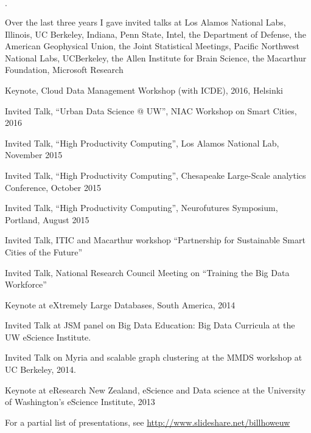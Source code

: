 \documentclass[10pt]{article}
\newenvironment{bulletlist}
   {
      \begin{list}
         {$\cdot$}
         {
            \setlength{\itemsep}{.5ex}
            \setlength{\parsep}{0ex}
            \setlength{\leftmargin}{0.7em}
            \setlength{\parskip}{0ex}
            \setlength{\topsep}{0ex}
         }
   }
   {
      \end{list}
   }
\newcommand{\marginlabel}[1]{
\begin{minipage}[b]{0.8\labelwidth}{\large \textsf{\textbf{#1}}}\end{minipage}}
\newcommand{\entrylabel}[1]{\mbox{\marginlabel{#1}}\hfill}
\newcommand{\MainListlabel}[1]
   {
      \parbox[t]{\labelwidth}{\hspace{.8em}\marginlabel{#1}}
   }
\newenvironment{MainList}[1]
   {
      \renewcommand{\entrylabel}{\MainListlabel}
      \begin{list}{}
      {
         \renewcommand{\makelabel}{\entrylabel}
         \setlength   {\itemindent}{-.65em}
         \setlength   {\labelwidth}{#1}
         \setlength   {\leftmargin}{\labelwidth}
         \setlength   {\itemsep}{3ex}
      }
   }
   {
      \end{list}
   }
\begin{document}
\begin{MainList}{88pt}
\begin{bulletlist}
  \item Over the last three years I gave invited
  talks at Los Alamos National Labs, Illinois, UC Berkeley, Indiana, Penn State, Intel, the Department of Defense, 
  the American Geophysical Union, the Joint Statistical Meetings, Pacific Northwest National Labs, UCBerkeley,
  the Allen Institute for Brain Science, the Macarthur Foundation, Microsoft Research
  \item Keynote, Cloud Data Management Workshop (with ICDE), 2016, Helsinki
  \item Invited Talk, “Urban Data Science @ UW”, NIAC Workshop on Smart Cities, 2016
  \item Invited Talk, “High Productivity Computing”, Los Alamos National Lab, November 2015
  \item Invited Talk, “High Productivity Computing”, Chesapeake Large-Scale analytics Conference, October 2015
  \item Invited Talk, “High Productivity Computing”, Neurofutures Symposium, Portland, August 2015
  \item Invited Talk, ITIC and Macarthur workshop ``Partnership for Sustainable Smart Cities of the Future''
  \item Invited Talk, National Research Council Meeting on ``Training the Big Data Workforce''
  \item Keynote at eXtremely Large Databases, South America, 2014
  \item Invited Talk at JSM panel on Big Data Education: Big Data Curricula at the UW eScience Institute.
  \item Invited Talk on Myria and scalable graph clustering at the MMDS workshop at UC Berkeley, 2014.
  \item Keynote at eResearch New Zealand, eScience and Data science at the University of Washington's eScience Institute, 2013
  \item For a partial list of presentations, see \url{http://www.slideshare.net/billhoweuw}
\end{bulletlist}



\end{MainList}
\end{document}
